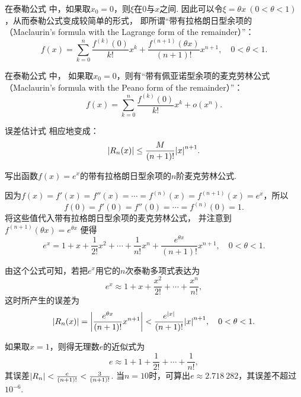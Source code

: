 在泰勒公式  中，如果取\(x_0 = 0\)，则\(\xi\)在\(0\)与\(x\)之间.
因此可以令\(\xi = \theta x\ (0 < \theta < 1)\)，从而泰勒公式变成较简单的形式，
即所谓“带有拉格朗日型余项的
（Maclaurin's formula with the Lagrange form of the remainder）”：
\begin{equation}\label{equation:微分中值定理.泰勒公式3}
	f(x)=\sum_{k=0}^n \frac{f^{(k)}(0)}{k!} x^k
		+ \frac{f^{(n+1)}(\theta x)}{(n+1)!} x^{n+1},
	\quad 0 < \theta < 1.
\end{equation}

在泰勒公式  中，
如果取\(x_0 = 0\)，则有“带有佩亚诺型余项的麦克劳林公式
（Maclaurin's formula with the Peano form of the remainder）”：
\begin{equation}\label{equation:微分中值定理.泰勒公式4}
f(x)=\sum_{k=0}^n \frac{f^{(k)}(0)}{k!} x^k + o(x^n).
\end{equation}

误差估计式  相应地变成：
\begin{equation}\label{equation:微分中值定理.泰勒公式.误差2}
\abs{R_n(x)} \leq \frac{M}{(n+1)!} \abs{x}^{n+1}.
\end{equation}

\begin{example}
写出函数\(f(x) = e^x\)的带有拉格朗日型余项的\(n\)阶麦克劳林公式.
\begin{solution}
因为\(f(x)=f'(x)=f''(x)=\dotsb=f^{(n)}(x)=f^{(n+1)}(x)=e^x\)，所以\[
f(0)=f'(0)=f''(0)=\dotsb=f^{(n)}(0)=1.
\]将这些值代入带有拉格朗日型余项的麦克劳林公式，
并注意到\(f^{(n+1)}(\theta x) = e^{\theta x}\)
便得\[
	e^x = 1 + x + \frac{1}{2!} x^2 + \dotsb
	+ \frac{1}{n!} x^n + \frac{e^{\theta x}}{(n+1)!} x^{n+1},
	\quad 0 < \theta < 1.
\]

由这个公式可知，若把\(e^x\)用它的\(n\)次泰勒多项式表达为\[
	e^x \approx 1 + x + \frac{x^2}{2!} + \dotsb + \frac{x^n}{n!},
\]
这时所产生的误差为\[
	\abs{R_n(x)} = \abs{\frac{e^{\theta x}}{(n+1)!} x^{n+1}}
	< \frac{e^{\abs{x}}}{(n+1)!} \abs{x}^{n+1},
	\quad 0 < \theta < 1.
\]

如果取\(x = 1\)，则得无理数\(e\)的近似式为\[
	e \approx 1 + 1 + \frac{1}{2!} + \dotsb + \frac{1}{n!},
\]
其误差\(\abs{R_n} < \frac{e}{(n+1)!} < \frac{3}{(n+1)!}\).
当\(n=10\)时，可算出\(e \approx 2.718\ 282\)，其误差不超过\(10^{-6}\).
\end{solution}
\end{example}

